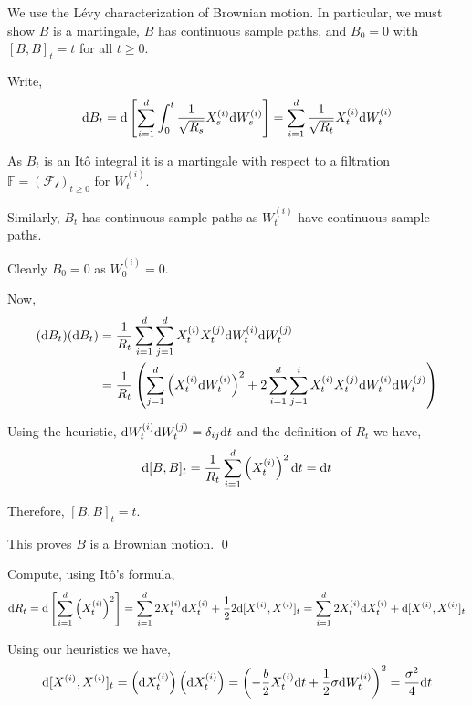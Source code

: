\begin{solution}[Solution]
We use the  L\'evy characterization of Brownian motion. In particular, we must show \( B \) is a martingale, \( B \) has continuous sample paths, and \( B_0 = 0 \) with \( [B,B]_t = t \) for all \( t\geq 0 \).

Write,
\begin{align*}
    \mathrm{d} B_t = \mathrm{d} \left[ \sum_{i=1}^{d} \int_{0}^{t} \dfrac{1}{\sqrt{R_s}}X_s^{(i)} \mathrm{d} W_s^{(i)} \right] = \sum_{i=1}^{d} \dfrac{1}{\sqrt{R_t}}X_t^{(i)} \mathrm{d} W_t^{(i)}
\end{align*}


As \( B_t \) is an It\^o integral it is a martingale with respect to a filtration \( \mathbb{F} = ( \mathcal{F_t} )_{t\geq 0} \) for \( W_t^{(i)} \).

Similarly, \( B_t \) has continuous sample paths as \( W_t^{(i)} \) have continuous sample paths.

Clearly \( B_0 = 0 \) as \( W_0^{(i)} = 0 \).

Now, 
\begin{align*}
    (\mathrm{d} B_t)(\mathrm{d} B_t) &= \dfrac{1}{R_t} \sum_{i=1}^{d}\sum_{j=1}^{d}X_t^{(i)}X_t^{(j)} \mathrm{d} W_t^{(i)} \mathrm{d} W_t^{(j)} \\
    &= \dfrac{1}{R_t} \left( \sum_{j=1}^{d} \left(X_t^{(i)} \mathrm{d} W_t^{(i)}\right)^2  + 2\sum_{i=1}^{d}\sum_{j=1}^{i} X_t^{(i)}X_t^{(j)} \mathrm{d} W_t^{(i)} \mathrm{d} W_t^{(j)} \right) 
\end{align*}

Using the heuristic, \( \mathrm{d} W_t^{(i)} \mathrm{d} W_t^{(j)} = \delta_{ij} \mathrm{d} t \) and the definition of \( R_t \) we have,
\begin{align*}
    \mathrm{d}[B,B]_t = \dfrac{1}{R_t} \sum_{i=1}^{d} \left( X_t^{(i)} \right)^2 \mathrm{d} t = \mathrm{d} t
\end{align*}

Therefore, \( [B,B]_t = t \).

This proves \( B \) is a Brownian motion. \qed

Compute, using It\^o's formula,
\begin{align*}
    \mathrm{d} R_t 
    = \mathrm{d} \left[ \sum_{i=1}^{d} \left( X_t^{(i)} \right)^2 \right]
    = \sum_{i=1}^{d} 2 X_t^{(i)} \mathrm{d} X_t^{(i)} + \frac{1}{2} 2 \mathrm{d} [X^{(i)},X^{(i)}] _t 
    = \sum_{i=1}^{d} 2X_t^{(i)} \mathrm{d} X_t^{(i)} + \mathrm{d}[X^{(i)},X^{(i)}]_t
\end{align*}

Using our heuristics we have,
\begin{align*}
    \mathrm{d}[X^{(i)},X^{(i)}]_t = \left( \mathrm{d} X_t^{(i)} \right) \left(\mathrm{d} X_t^{(i)} \right) 
    = \left( -\dfrac{b}{2} X_t^{(i)} \mathrm{d} t + \dfrac{1}{2}\sigma \mathrm{d} W_t^{(i)} \right)^2 
    = \dfrac{\sigma^2}{4} \mathrm{d} t
\end{align*}


\end{solution}
